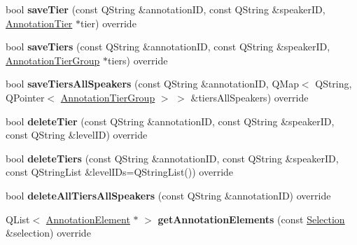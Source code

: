\begin{DoxyCompactItemize}
bool {\bfseries save\+Tier} (const Q\+String \&annotation\+ID, const Q\+String \&speaker\+ID, \hyperlink{class_annotation_tier}{Annotation\+Tier} $\ast$tier) override
\item 
\mbox{\label{class_s_q_l_annotation_datastore_af11379368a5f9e7f2c9ecbe073bd795e}} 
bool {\bfseries save\+Tiers} (const Q\+String \&annotation\+ID, const Q\+String \&speaker\+ID, \hyperlink{class_annotation_tier_group}{Annotation\+Tier\+Group} $\ast$tiers) override
\item 
\mbox{\label{class_s_q_l_annotation_datastore_aaeef7c24602b06977c657ff896877d4a}} 
bool {\bfseries save\+Tiers\+All\+Speakers} (const Q\+String \&annotation\+ID, Q\+Map$<$ Q\+String, Q\+Pointer$<$ \hyperlink{class_annotation_tier_group}{Annotation\+Tier\+Group} $>$ $>$ \&tiers\+All\+Speakers) override
\item 
\mbox{\label{class_s_q_l_annotation_datastore_a48a216c0577bfa6f2b0909aca5fd4235}} 
bool {\bfseries delete\+Tier} (const Q\+String \&annotation\+ID, const Q\+String \&speaker\+ID, const Q\+String \&level\+ID) override
\item 
\mbox{\label{class_s_q_l_annotation_datastore_a23edb33c8d6a2553e8928fd7057c54c3}} 
bool {\bfseries delete\+Tiers} (const Q\+String \&annotation\+ID, const Q\+String \&speaker\+ID, const Q\+String\+List \&level\+I\+Ds=Q\+String\+List()) override
\item 
\mbox{\label{class_s_q_l_annotation_datastore_a77e1a02e7d617064b2b66af7274bf7f3}} 
bool {\bfseries delete\+All\+Tiers\+All\+Speakers} (const Q\+String \&annotation\+ID) override
\item 
\mbox{\label{class_s_q_l_annotation_datastore_a5af601e8af8d84ebdbc1f4e26a0cf30b}} 
Q\+List$<$ \hyperlink{class_annotation_element}{Annotation\+Element} $\ast$ $>$ {\bfseries get\+Annotation\+Elements} (const \hyperlink{class_annotation_datastore_1_1_selection}{Selection} \&selection) override
\item 
\mbox{\label{class_s_q_l_annotation_datastore_a82f6bab1117f9990ce2cc38e439d08fc}} 

\end{DoxyCompactItemize}
